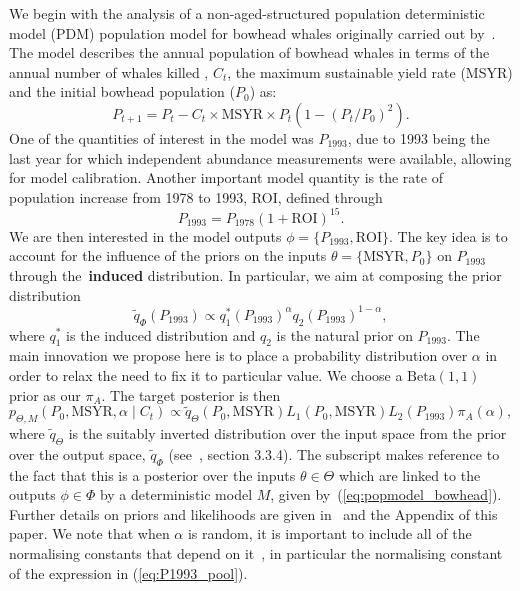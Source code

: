 \documentclass[a4paper, notitlepage, 10pt]{article}
\begin{document}
We begin with the analysis of a non-aged-structured population deterministic model (PDM) population model for bowhead whales originally carried out by~\cite{poole2000}.
The model describes the annual population of bowhead whales in terms of the annual number of whales killed , $C_t$, the maximum sustainable yield rate (MSYR) and the initial bowhead population ($P_0$) as:
\begin{equation}
\label{eq:popmodel_bowhead}
 P_{t + 1} = P_t - C_t \times \text{MSYR} \times P_t \left( 1- (P_t/P_0)^2 \right).
\end{equation}
One of the quantities of interest in the model was $P_{\text{1993}}$, due to 1993 being the last year for which independent abundance measurements were available, allowing for model calibration.
Another important model quantity is the rate of population increase from 1978 to 1993, ROI, defined through
\begin{equation*}
 \label{eq:ROI_P1993}
P_{1993} = P_{1978}(1 + \text{ROI})^{15}. 
\end{equation*}
We are then interested in the model outputs $\phi = \{P_{1993}, \text{ROI}\}$.
The key idea is to account for the influence of the priors on the inputs $\theta = \{\text{MSYR}, P_0\}$ on $P_{1993}$ through the~\textbf{induced} distribution.
In particular, we aim at composing the prior distribution
\begin{equation}
 \label{eq:P1993_pool}
 \tilde{q}_{\Phi}(P_{1993}) \propto q_1^\ast(P_{1993})^\alpha q_2(P_{1993})^{1-\alpha},
\end{equation}
where $q_1^\ast$ is the induced distribution and $q_2$ is the natural prior on $P_{1993}$.
The main innovation we propose here is to place a probability distribution over $\alpha$ in order to relax the need to fix it to particular value.
We choose a $\text{Beta}(1, 1)$ prior as our $\pi_A$.
The target posterior is then 
\begin{equation}
 \label{eq:bowhead_posterior}
  p_{\Theta, M}(P_0, \text{MSYR}, \alpha \mid C_t) \propto \tilde{q}_{\Theta}(P_0, \text{MSYR}) L_1(P_0, \text{MSYR}) L_2(P_{1993})\pi_A(\alpha),
\end{equation}
where $\tilde{q}_{\Theta}$ is the suitably inverted distribution over the input space from the prior over the output space, $\tilde{q}_{\Phi}$ (see~\cite{poole2000}, section 3.3.4). 
The subscript makes reference to the fact that this is a posterior over the inputs $\theta \in \Theta$ which are linked to the outputs $\phi \in \Phi$ by a deterministic model $M$, given by~(\ref{eq:popmodel_bowhead}).
Further details on priors and likelihoods are given in~\cite{poole2000} and the Appendix of this paper.
We note that when $\alpha$ is random, it is important to include all of the normalising constants that depend on it~\citep{Neuenschwander2009}, in particular the normalising constant of the expression in (\ref{eq:P1993_pool}).
\end{document}
